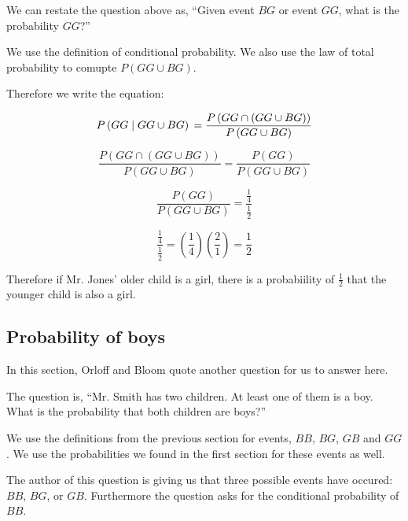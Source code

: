 \documentclass[a4paper,11pt]{article}
\begin{document}
We can restate the question above as,  ``Given event $BG$
or event $GG$, what is the probability $GG$?'' 

We use the definition of conditional probability. We also use the law of
total probability to comupte $P \left( GG \cup BG \right)$.

Therefore we write the equation:

\begin{equation}
P \left( GG \mid GG \cup BG \right) \\
 = \frac{ P \left( GG \cap \left( GG \cup BG \right) \right)}
  {P \left( GG \cup BG \right)}
\end{equation}

\begin{equation}
\frac{ P \left( GG \cap \left( GG \cup BG \right) \right)}
  {P \left( GG \cup BG \right)}
 = \frac{ P \left( GG \right) }
  {P \left( GG \cup BG \right)}
\end{equation}

\begin{equation}
 \frac{ P \left( GG \right) }
  {P \left( GG \cup BG \right)}
= \frac { \frac{1}{4} }
{ \frac{1}{2} }
\end{equation}

\begin{equation}
\frac { \frac{1}{4} }
{ \frac{1}{2} }
= \left( \frac{1}{4} \right) \left( \frac{2}{1} \right)
=\frac{1}{2}
\end{equation}

Therefore if Mr. Jones' older child is a girl, there is a 
probabiility of $\frac{1}{2}$ that the younger child is also a girl.


\subsection{Probability of boys}

In this section, Orloff and Bloom quote another question for us to 
answer here.

The question is, ``Mr. Smith has two children. At least one of them is a
boy. What is the probability that both children are boys?''

We use the definitions from the previous section for events, $BB$, $BG$,
$GB$ and $GG$. We use the probabilities we found in the first section
for these events as well.

The  author of this question is giving us that three possible events
have occured: $BB$, $BG$, or $GB$.  Furthermore the question asks
for the conditional probability of $BB$.
\end{document}

